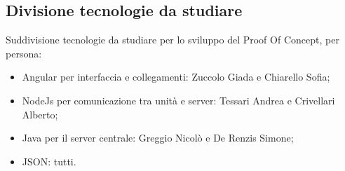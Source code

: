\subsection{Divisione tecnologie da studiare}
Suddivisione tecnologie da studiare per lo sviluppo del Proof Of Concept, per persona:
\begin{itemize}
	\item Angular per interfaccia e collegamenti: Zuccolo Giada e Chiarello Sofia;
	\item NodeJs per comunicazione tra unità e server: Tessari Andrea e Crivellari Alberto;
	\item Java per il server centrale: Greggio Nicolò e De Renzis Simone;
	\item JSON: tutti.
\end{itemize}
